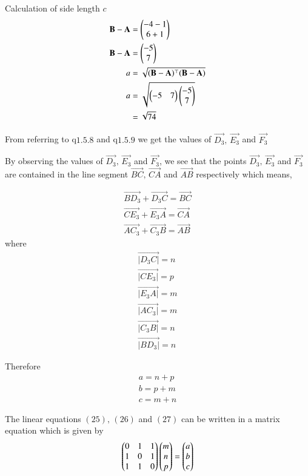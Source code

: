 \documentclass[journal,12pt,twocolumn]{IEEEtran}
\theoremstyle{remark}
\begin{document}
\vspace{0.3cm}
Calculation of side length $c$
\begin{align}
\mathbf{B}-\mathbf{A} &= \begin{pmatrix}-4-1\\6+1\end{pmatrix}\\
\mathbf{B}-\mathbf{A} &= \begin{pmatrix}-5\\7\end{pmatrix}\\
a &= \sqrt{(\mathbf{B}-\mathbf{A})^{\top}(\mathbf{B}-\mathbf{A})}\\
a &= \sqrt{\begin{pmatrix}-5&7\end{pmatrix}\begin{pmatrix}-5\\7\end{pmatrix}}\\
&= \sqrt{74}
\end{align}

\vspace{0.3cm}
From referring to q$1.5.8$ and q$1.5.9$ we get the values of $\vec{D_3},\, \vec{E_3}$ and $\vec{F_3}$

\vspace{0.3cm}
By observing the values of $\vec{D_3},\, \vec{E_3}$ and $\vec{F_3}$, we see that the points $\vec{D_3},\, \vec{E_3}$ and $\vec{F_3}$ are contained in the line segment $\vec{BC}, \, \vec{CA}$ and $\vec{AB}$ respectively which means,

\begin{align}
\vec{BD_3} + \vec{D_{3}C} = \vec{BC}\\
\vec{CE_3} + \vec{E_{3}A} = \vec{CA}\\
\vec{AC_3} + \vec{C_{3}B} = \vec{AB}
\end{align}
where
\begin{align}
\vec{|D_3C|}=n \\
\vec{|CE_3|}=p \\
\vec{|E_{3}A|}=m \\
\vec{|AC_{3}|}=m\\
\vec{|C_{3}B|}=n\\
\vec{|BD_{3}|}=n
\end{align}

\vspace{0.3cm}
Therefore
\begin{align}
a = n+p\\
b = p+m\\
c = m+n
\end{align}

\vspace{0.3cm}
The linear equations $(25),\,(26)$ and $(27)$ can be written in a matrix equation which is given by
\begin{align}
\begin{pmatrix}0&1&1\\1&0&1\\1&1&0\end{pmatrix}\begin{pmatrix}m\\n\\p\end{pmatrix} = \begin{pmatrix}a\\b\\c\end{pmatrix}
\end{align}
\end{document}
